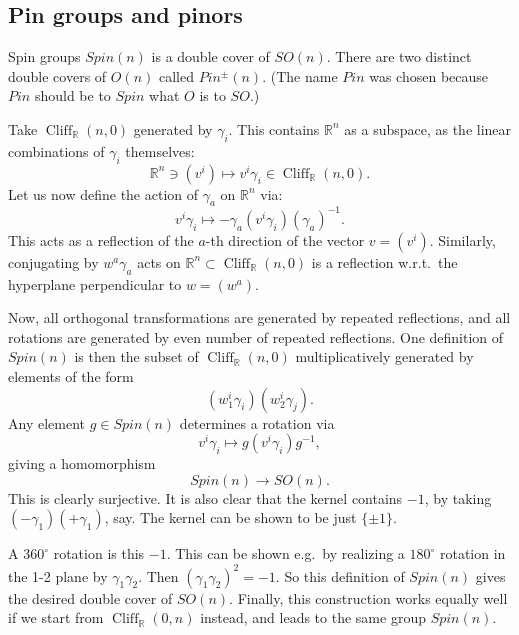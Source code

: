 \documentclass[12pt]{article}
\numberwithin{equation}{section}
\numberwithin{figure}{section}
\theoremstyle{remark}
\def\bR{\mathbb{R}}
\def\Cliff{\mathop{\mathrm{Cliff}}\nolimits}
\begin{document}
\subsection{Pin groups and pinors}
Spin groups $Spin(n)$ is a double cover of $SO(n)$.
There are two distinct double covers of $O(n)$ called $Pin^\pm(n)$.
(The name $Pin$ was chosen because $Pin$ should be to $Spin$ what $O$ is to $SO$.)

Take $\Cliff_\bR(n,0)$ generated by $\gamma_i$. 
This contains $\bR^n$ as a subspace, as the linear combinations of $\gamma_i$ themselves: \begin{equation}
\bR^n \ni (v^i) \mapsto v^i\gamma_i \in \Cliff_\bR(n,0).
\end{equation}
Let us now define the action of $\gamma_a$ on $\bR^n $ via: \begin{equation}
v^i \gamma_i \mapsto - \gamma_a (v^i \gamma_i) (\gamma_a)^{-1} .
\end{equation}
This acts as a reflection of the $a$-th direction of the vector $v=(v^i)$.
Similarly, conjugating by $w^a \gamma_a$ acts on $\bR^n \subset \Cliff_\bR(n,0)$ 
is a reflection w.r.t.~the hyperplane perpendicular to $w=(w^a)$.

Now, all orthogonal transformations are generated by repeated reflections,
and all rotations are generated by even number of repeated reflections.
One definition of $Spin(n)$ is then the subset of $\Cliff_\bR(n,0)$ 
multiplicatively generated by elements of the form
\begin{equation}
(w_1^i \gamma_i)(w_2^i \gamma_j).
\end{equation}
Any element $g\in Spin(n)$ determines a rotation via \begin{equation}
v^i\gamma_i \mapsto g(v^i\gamma_i) g^{-1},
\end{equation} giving a homomorphism \begin{equation}
Spin(n)\to SO(n).
\end{equation}
This is clearly surjective. 
It is also clear that the kernel contains $-1$, by taking $(-\gamma_1)(+\gamma_1)$, say.
The kernel can be shown to be just $\{\pm1\}$.

A $360^\circ$ rotation is this $-1$.
This can be shown e.g.~by realizing a $180^\circ$ rotation in the 1-2 plane
by $\gamma_1\gamma_2$. 
Then $(\gamma_1\gamma_2)^2=-1$.
So this definition of $Spin(n)$ gives the desired double cover of $SO(n)$.
Finally, this construction works equally well if we start from $\Cliff_\bR(0,n)$ instead,
and leads to the same group $Spin(n)$.
\end{document}
